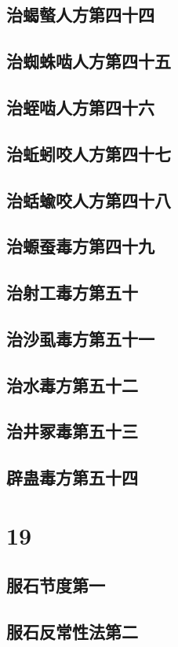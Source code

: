 \documentclass[a4paper,12pt,UTF8,twoside]{ctexbook}
\begin{document}
\chapter{治蝎螫人方第四十四}
\chapter{治蜘蛛啮人方第四十五}
\chapter{治蛭啮人方第四十六}
\chapter{治蚯蚓咬人方第四十七}
\chapter{治蛞蝓咬人方第四十八}
\chapter{治螈蚕毒方第四十九}
\chapter{治射工毒方第五十}
\chapter{治沙虱毒方第五十一}
\chapter{治水毒方第五十二}
\chapter{治井冢毒第五十三}
\chapter{辟蛊毒方第五十四}

\part{19}
\chapter{服石节度第一}
\chapter{服石反常性法第二}
\end{document}
